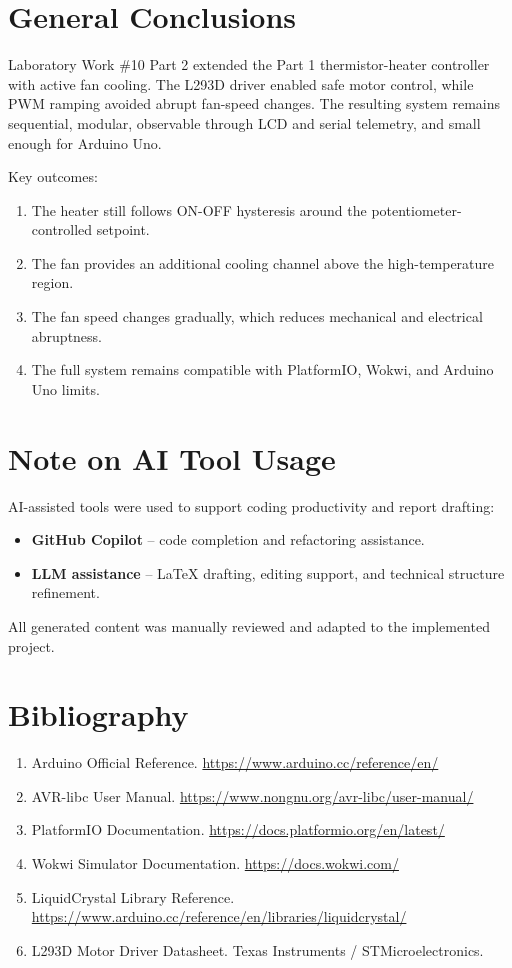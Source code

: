 \documentclass[12pt]{article}
\begin{document}
\section*{General Conclusions}
\hspace{0.8cm} Laboratory Work \#10 Part 2 extended the Part 1 thermistor-heater controller with active fan cooling. The L293D driver enabled safe motor control, while PWM ramping avoided abrupt fan-speed changes. The resulting system remains sequential, modular, observable through LCD and serial telemetry, and small enough for Arduino Uno.

Key outcomes:
\begin{enumerate}
    \item The heater still follows ON-OFF hysteresis around the potentiometer-controlled setpoint.
    \item The fan provides an additional cooling channel above the high-temperature region.
    \item The fan speed changes gradually, which reduces mechanical and electrical abruptness.
    \item The full system remains compatible with PlatformIO, Wokwi, and Arduino Uno limits.
\end{enumerate}

\section*{Note on AI Tool Usage}
\hspace{0.8cm} AI-assisted tools were used to support coding productivity and report drafting:
\begin{itemize}
    \item \textbf{GitHub Copilot} -- code completion and refactoring assistance.
    \item \textbf{LLM assistance} -- LaTeX drafting, editing support, and technical structure refinement.
\end{itemize}
All generated content was manually reviewed and adapted to the implemented project.

\section*{Bibliography}
\begin{enumerate}
    \item Arduino Official Reference. \url{https://www.arduino.cc/reference/en/}
    \item AVR-libc User Manual. \url{https://www.nongnu.org/avr-libc/user-manual/}
    \item PlatformIO Documentation. \url{https://docs.platformio.org/en/latest/}
    \item Wokwi Simulator Documentation. \url{https://docs.wokwi.com/}
    \item LiquidCrystal Library Reference. \url{https://www.arduino.cc/reference/en/libraries/liquidcrystal/}
    \item L293D Motor Driver Datasheet. Texas Instruments / STMicroelectronics.
\end{enumerate}
\end{document}
